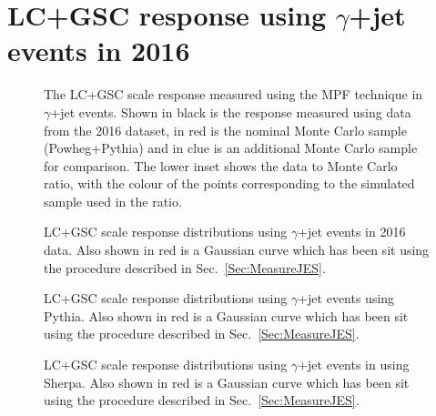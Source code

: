 \chapter{LC+GSC response using $\gamma$+jet events in 2016}
\label{App:GJetLC2016}

\begin{figure}[!ht]
  \begin{center}
  \end{center}
  \caption[LC scale response using $\gamma$+jet in 2016]
  {\small The LC+GSC scale response measured using the MPF technique in $\gamma$+jet events.  Shown in black is the response measured using data from the 2016 dataset, in red is the nominal Monte Carlo sample (Powheg+Pythia) and in clue is an additional Monte Carlo sample for comparison.  The lower inset shows the data to Monte Carlo ratio, with the colour of the points corresponding to the simulated sample used in the ratio.  }
  \label{plot:GJetLC2016App}
\end{figure}


\begin{figure}[!ht]
  \begin{center}
  \end{center}
  \caption[LC scale response distributions in data using $\gamma$+jet in 2016]
  {\small LC+GSC scale response distributions using $\gamma$+jet events in 2016 data.  Also shown in red is a Gaussian curve which has been sit using the procedure described in Sec.~\ref{Sec:MeasureJES}. }
  \label{plot:GJetLC2016DataDistsApp}
\end{figure}

\begin{figure}[!ht]
  \begin{center}
  \end{center}
  \caption[LC scale response distributions in Pythia using $\gamma$+jet in 2016]
  {\small LC+GSC scale response distributions using $\gamma$+jet events using Pythia.  Also shown in red is a Gaussian curve which has been sit using the procedure described in Sec.~\ref{Sec:MeasureJES}. }
  \label{plot:GJetLC2016PythiaistsApp}
\end{figure}

\begin{figure}[!ht]
  \begin{center}
  \end{center}
  \caption[LC scale response distributions in Sherpa using $\gamma$+jet in 2016]
  {\small LC+GSC scale response distributions using $\gamma$+jet events in using Sherpa.  Also shown in red is a Gaussian curve which has been sit using the procedure described in Sec.~\ref{Sec:MeasureJES}. }
  \label{plot:GJetLC2016SherpaDistsApp}
\end{figure}

